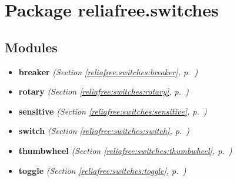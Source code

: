 %
%
%


\section{Package reliafree.switches}

    \label{reliafree:switches}


\subsection{Modules}

\begin{itemize}
\setlength{\parskip}{0ex}
\item \textbf{breaker}
  \textit{(Section \ref{reliafree:switches:breaker}, p.~\pageref{reliafree:switches:breaker})}

\item \textbf{rotary}
  \textit{(Section \ref{reliafree:switches:rotary}, p.~\pageref{reliafree:switches:rotary})}

\item \textbf{sensitive}
  \textit{(Section \ref{reliafree:switches:sensitive}, p.~\pageref{reliafree:switches:sensitive})}

\item \textbf{switch}
  \textit{(Section \ref{reliafree:switches:switch}, p.~\pageref{reliafree:switches:switch})}

\item \textbf{thumbwheel}
  \textit{(Section \ref{reliafree:switches:thumbwheel}, p.~\pageref{reliafree:switches:thumbwheel})}

\item \textbf{toggle}
  \textit{(Section \ref{reliafree:switches:toggle}, p.~\pageref{reliafree:switches:toggle})}

\end{itemize}



